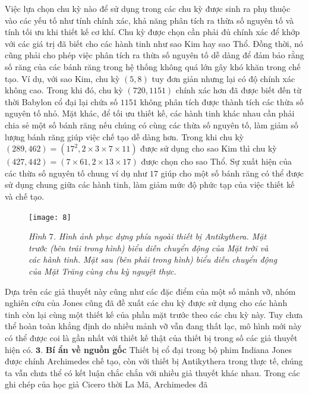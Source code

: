\begin{multicols}{2}
	Việc lựa chọn chu kỳ nào để sử dụng trong các chu kỳ được sinh ra phụ thuộc vào các yếu tố như tính chính xác, khả năng phân tích ra thừa số nguyên tố và tính tối ưu khi thiết kế cơ khí. Chu kỳ được chọn cần phải đủ chính xác để khớp với các giá trị đã biết cho các hành tinh như sao Kim hay sao Thổ. Đồng thời, nó cũng phải cho phép việc phân tích ra thừa số nguyên tố dễ dàng để đảm bảo rằng số răng của các bánh răng trong hệ thống không quá lớn gây khó khăn trong chế tạo. Ví dụ, với sao Kim, chu kỳ $(5,8)$ tuy đơn giản nhưng lại có độ chính xác không cao. Trong khi đó, chu kỳ $(720,1151)$ chính xác hơn đã được biết đến từ thời Babylon cổ đại lại chứa số $1151$ không phân tích được thành tích các thừa số nguyên tố nhỏ. Mặt khác, để tối ưu thiết kế, các hành tinh khác nhau cần phải chia sẻ một số bánh răng nếu chúng có cùng các thừa số nguyên tố, làm giảm số lượng bánh răng giúp việc chế tạo dễ dàng hơn. Trong khi chu kỳ $(289,462)=(17^2,2\times3\times7\times11)$ được sử dụng cho sao Kim thì chu kỳ $(427,442)=(7\times61,2\times13\times17)$ được chọn cho sao Thổ. Sự xuất hiện của các thừa số nguyên tố chung ví dụ như $17$ giúp cho một số bánh răng có thể được sử dụng chung giữa các hành tinh, làm giảm mức độ phức tạp của việc thiết kế và chế tạo.
	\begin{figure}[H]
		\vspace*{-5pt}
		\centering
		\captionsetup{labelformat= empty, justification=centering}
		\texttt{[image: 8]}
		\caption{\small\textit{\color{lichsutoanhoc}Hình $7$. Hình ảnh phục dựng phía ngoài thiết bị Antikythera. Mặt trước (bên trái trong hình) biểu diễn chuyển động của Mặt trời và các hành tinh. Mặt sau (bên phải trong hình) biểu diễn chuyển động của Mặt Trăng cùng chu kỳ nguyệt thực.}}
		\vspace*{-10pt}
	\end{figure}
	Dựa trên các giả thuyết này cũng như các đặc điểm của một số mảnh vỡ, nhóm nghiên cứu của Jones cũng đã đề xuất các chu kỳ được sử dụng cho các hành tinh còn lại cùng một thiết kế của phần mặt trước theo các chu kỳ này. Tuy chưa thể hoàn toàn khẳng định do nhiều mảnh vỡ vẫn đang thất lạc, mô hình mới này có thể được coi là gần nhất với thiết kế thật của thiết bị trong số các giả thuyết hiện có. 
	\vskip 0.1cm
	$\pmb{3.}$ \textbf{\color{lichsutoanhoc}Bí ẩn về nguồn gốc}
	\vskip 0.1cm
	Thiết bị cổ đại trong bộ phim Indiana Jones được chính Archimedes chế tạo, còn với thiết bị Antikythera trong thực tế, chúng ta vẫn chưa thể có kết luận chắc chắn với nhiều giả thuyết khác nhau. Trong các ghi chép của học giả Cicero thời La Mã, Archimedes đã
\end{multicols}
